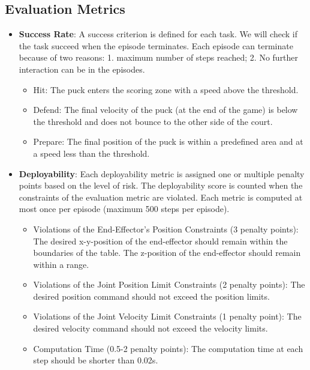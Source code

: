 \subsection{Evaluation Metrics}
    \begin{itemize}
        \item \textbf{Success Rate}:
        A success criterion is defined for each task. We will check if the task succeed when the episode terminates. Each episode can terminate because of two reasons: 1. maximum number of steps reached; 2. No further interaction can be in the episodes.
        \begin{itemize}
            \item Hit: The puck enters the scoring zone with a speed above the threshold.
            \item Defend: The final velocity of the puck (at the end of the game) is below the threshold and does not bounce to the other side of the court.
            \item Prepare: The final position of the puck is within a predefined area and at a speed less than the threshold.
        \end{itemize}

        \item \textbf{Deployability}: Each deployability metric is assigned one or multiple penalty points based on the level of risk. The deployability score is counted when the constraints of the evaluation metric are violated. Each metric is computed at most once per episode (maximum 500 steps per episode). 
        \begin{itemize}
            \item Violations of the End-Effector's Position Constraints (3 penalty points): 
            The desired x-y-position of the end-effector should remain within the boundaries of the table. The z-position of the end-effector should remain within a range.
            \item Violations of the Joint Position Limit Constraints (2 penalty points): The desired position command should not exceed the position limits.
            \item Violations of the Joint Velocity Limit Constraints (1 penalty point): The desired velocity command should not exceed the velocity limits.
            \item Computation Time (0.5-2 penalty points): The computation time at each step should be shorter than 0.02s.
        \end{itemize}
    \end{itemize}

